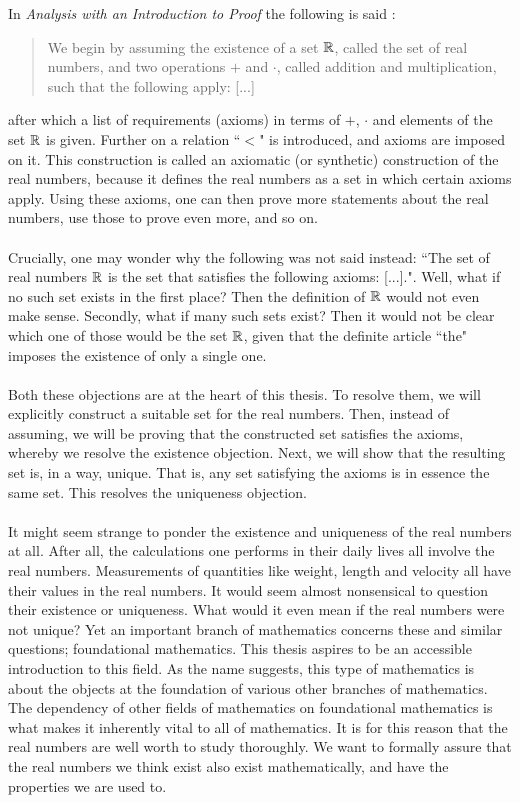 \documentclass[../main.tex]{subfiles}
\begin{document}
In \textit{Analysis with an Introduction to Proof} the following is said \cite{Lay2014}:
\begin{quote}
    We begin by assuming the existence of a set $\mathbb{R}$, called the set of real numbers, and two operations $+$ and $\cdot$, called addition and multiplication, such that the following apply: [...]
\end{quote}
after which a list of requirements (axioms) in terms of $+$, $\cdot$ and elements of the set $\mathbb{R}$ is given. Further on a relation ``$<$" is introduced, and axioms are imposed on it. This construction is called an axiomatic (or synthetic) construction of the real numbers, because it defines the real numbers as a set in which certain axioms apply. Using these axioms, one can then prove more statements about the real numbers, use those to prove even more, and so on. \\\\
Crucially, one may wonder why the following was not said instead: ``The set of real numbers $\mathbb{R}$ is the set that satisfies the following axioms: [...].". Well, what if no such set exists in the first place? Then the definition of $\mathbb{R}$ would not even make sense. Secondly, what if many such sets exist? Then it would not be clear which one of those would be the set $\mathbb{R}$, given that the definite article ``the" imposes the existence of only a single one. \\\\
Both these objections are at the heart of this thesis. To resolve them, we will explicitly construct a suitable set for the real numbers. Then, instead of assuming, we will be proving that the constructed set satisfies the axioms, whereby we resolve the existence objection. Next, we will show that the resulting set is, in a way, unique. That is, any set satisfying the axioms is in essence the same set. This resolves the uniqueness objection. \\\\
It might seem strange to ponder the existence and uniqueness of the real numbers at all. After all, the calculations one performs in their daily lives all involve the real numbers. Measurements of quantities like weight, length and velocity all have their values in the real numbers. It would seem almost nonsensical to question their existence or uniqueness. What would it even mean if the real numbers were not unique? Yet an important branch of mathematics concerns these and similar questions; foundational mathematics. This thesis aspires to be an accessible introduction to this field. As the name suggests, this type of mathematics is about the objects at the foundation of various other branches of mathematics. The dependency of other fields of mathematics on foundational mathematics is what makes it inherently vital to all of mathematics. It is for this reason that the real numbers are well worth to study thoroughly. We want to formally assure that the real numbers we think exist also exist mathematically, and have the properties we are used to. \\\\
\end{document}
